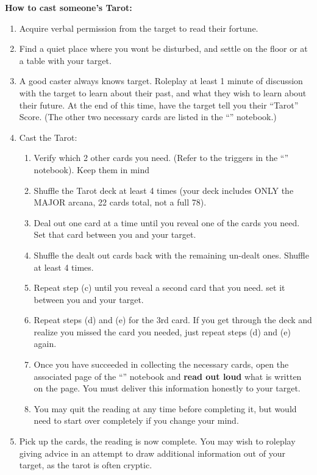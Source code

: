 \documentclass[green]{NeptuneBall}
\begin{document}
{\bf How to cast someone's Tarot:}
\begin{enumerate}
  \item Acquire verbal permission from the target to read their fortune.
  \item Find a quiet place where you wont be disturbed, and settle on the floor or at a table with your target.
  \item A good caster always knows \cSlave{\their} target. Roleplay at least 1 minute of discussion with the target to learn about their past, and what they wish to learn about their future. At the end of this time, have the target tell you their ``Tarot'' Score. (The other two necessary cards are listed in the ``\mTarot{\MYname}'' notebook.)
  \item Cast the Tarot:
  \begin{enumerate}
    \item Verify which 2 other cards you need. (Refer to the triggers in the ``\mTarot{\MYname}'' notebook). Keep them in mind
    \item Shuffle the Tarot deck at least 4 times (your deck includes ONLY the MAJOR arcana, 22 cards total, not a full 78).
    \item Deal out one card at a time until you reveal one of the cards you need. Set that card between you and your target.
    \item Shuffle the dealt out cards back with the remaining un-dealt ones. Shuffle at least 4 times.
    \item Repeat step (c) until you reveal a second card that you need. set it between you and your target.
    \item Repeat steps (d) and (e) for the 3rd card. If you get through the deck and realize you missed the card you needed, just repeat steps (d) and (e) again.
		\item Once you have succeeded in collecting the necessary cards, open the associated page of the ``\mTarot{\MYname}'' notebook and {\bf read out loud} what is written on the page. You must deliver this information honestly to your target.
    \item You may quit the reading at any time before completing it, but would need to start over completely if you change your mind. 
  \end{enumerate}
  \item Pick up the cards, the reading is now complete. You may wish to roleplay giving advice in an attempt to draw additional information out of your target, as the tarot is often cryptic.
\end{enumerate}
\end{document}
